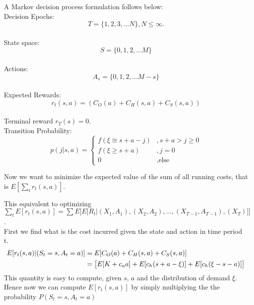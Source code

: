 \documentclass[12pt,a4paper,oneside]{report}
\begin{document}
A Markov decision process formulation follows below:\\
\noindent Decision Epochs:\\
\begin{equation*}T = \lbrace 1,2,3,...N \rbrace,   N \leq \infty. 
\end{equation*}\\
\noindent State space:\\
\begin{equation*}S = \lbrace 0,1,2,...M \rbrace  
\end{equation*}\\
\noindent Actions:\\
\begin{equation*}A_s  = \lbrace0,1,2,...M-s \rbrace
\end{equation*}\\
\noindent Expected Rewards:\\
\begin{equation*}r_t(s,a) = (C_O(a) + C_H(s,a) + C_S(s,a)) 
\end{equation*}\\
\noindent Terminal reward $r_T(s)=0$.
\noindent \\Transition Probability:\\
\begin{equation*}
p(j|s,a)=
\begin{cases}
f(\xi\cong s+a-j)&,{s+a}>j\geq0\\
f(\xi\geq s+a)&,j=0\\
0&,\text{else}
\end{cases}
\end{equation*}

Now we want to minimize the expected value of the sum of all running costs, that is $E[\sum_t r_t(s,a) ]$.

This equivalent to optimizing\\ $\sum_t E[r_t(s,a)] = \sum E \bigg[ E\Big[{R_t}|{(X_1,A_1),(X_2,A_2),...,(X_{T-1},A_{T-1}),(X_T)}\Big]\bigg] $.\\
\noindent First we find what is the cost incurred given the state and action in time period t.
\begin{align*}
\nonumber
E[r_t(s,a)|{(S_t=s,A_t=a)}] &=  E[C_O(a) + C_H(s,a) + C_S(s,a)]\\
\hspace{1.7cm} &= \big [ E[K+ c_u {a} ]+ E[c_h(s+a-\xi) ] +  E[c_h(\xi-s-a) ]\big]
\end{align*}
This quantity is easy to compute, given $s$, $a$ and the distribution of demand $\xi$.
Hence now we can compute $E[r_t(s,a)]$ by simply multiplying the the probability $P( S_t=s, A_t=a)$
\end{document}
